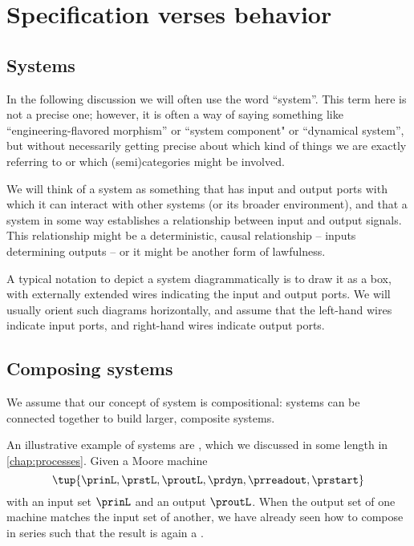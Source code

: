 
\section{Specification verses behavior}

\subsection{Systems}

In the following discussion we will often use the word ``system''.
This term here is not a precise one; however, it is often a way of saying something like ``engineering-flavored morphism'' or ``system component" or ``dynamical system'', but without necessarily getting precise about which kind of things we are exactly referring to or which (semi)categories might be involved.

We will think of a system as something that has input and output ports with which it can interact with other systems (or its broader environment), and that a system in some way establishes a relationship between input and output signals.
This relationship might be a deterministic, causal relationship -- inputs determining outputs -- or it might be another form of lawfulness.

A typical notation to depict a system diagrammatically is to draw it as a box, with externally extended wires indicating the input and output ports.
We will usually orient such diagrams horizontally, and assume that the left-hand wires indicate input ports, and right-hand wires indicate output ports.


\subsection{Composing systems}

We assume that our concept of system is compositional: systems can be connected together to build larger, composite systems.

An illustrative example of systems are , which we discussed in some length in \cref{chap:processes}.
Given a Moore machine
\begin{equation}
    \label{eq:moore-machine-specification}
    \tup{\prinL,\prstL,\proutL,\prdyn,\prreadout,\prstart}
\end{equation}
with an input set $\prinL$ and an output $\proutL$.
When the output set of one machine matches the input set of another, we have already seen how to compose  in series such that the result is again a .

